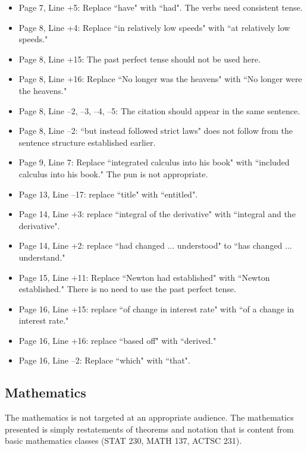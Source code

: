 \documentclass[11pt]{article}
\begin{document}
\begin{itemize}
\begin{itemize}
		\item Page 7, Line +5: Replace ``have" with ``had". The verbs need consistent tense.
		\item Page 8, Line +4: Replace ``in relatively low speeds" with ``at relatively low speeds."
		\item Page 8, Line +15: The past perfect tense should not be used here.
		\item Page 8, Line +16: Replace ``No longer was the heavens" with ``No longer were the heavens."
		\item Page 8, Line --2, --3, --4, --5: The citation should appear in the same sentence.
		\item Page 8, Line --2: ``but instead followed strict laws" does not follow from the sentence structure established earlier. 
		\item Page 9, Line 7: Replace ``integrated calculus into his book" with ``included calculus into his book." The pun is not appropriate. 
		\item Page 13, Line --17: replace ``title" with ``entitled". 
		\item Page 14, Line +3: replace ``integral of the derivative" with ``integral and the derivative".
		\item Page 14, Line +2: replace ``had changed ... understood" to ``has changed ... understand." 
		\item Page 15, Line +11: Replace ``Newton had established" with ``Newton established." There is no need to use the past perfect tense. 
		\item Page 16, Line +15: replace ``of change in interest rate" with ``of a change in interest rate." 
		\item Page 16, Line +16: replace ``based off" with ``derived."
		\item Page 16, Line --2: Replace ``which" with ``that".
		
		
	\end{itemize}
\end{itemize}

\subsection*{Mathematics}

The mathematics is not targeted at an appropriate audience. The mathematics presented is simply restatements of theorems and notation that is content from basic mathematics classes (STAT 230, MATH 137, ACTSC 231). 
\end{document}
